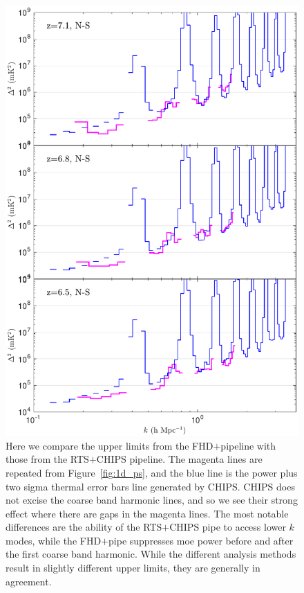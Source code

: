 \documentclass[iop]{emulateapj}
\begin{document}
\begin{figure}
\includegraphics[width=\columnwidth]{1D_spectra_comparison.pdf}
\caption{
Here we compare the upper limits from the FHD$+$\eppsilon pipeline with those from the 
RTS$+$CHIPS pipeline. The magenta lines are repeated from Figure~\ref{fig:1d_ps}, and the blue line
is the power plus two sigma thermal error bars line generated by CHIPS. CHIPS does not 
excise the coarse band harmonic lines, and so we see their strong effect where there are 
gaps in the magenta lines. The most notable differences are the ability of the RTS$+$CHIPS pipe
to access lower $k$ modes, while the FHD$+$\eppsilon pipe suppresses moe power before and
after the first coarse band harmonic. While the different analysis methods result in slightly
different upper limits, they are generally in agreement. 
\label{fig:ps_comparison}
}
\end{figure}
\end{document}
